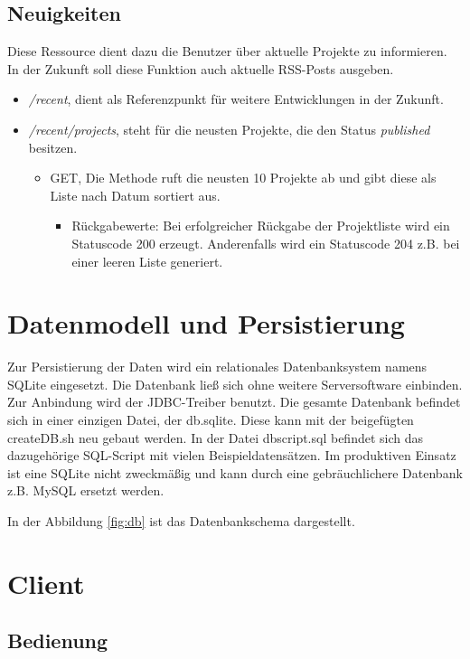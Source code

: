 \documentclass[12pt]{scrartcl}
\begin{document}
\subsection{Neuigkeiten}
Diese Ressource dient dazu die Benutzer über aktuelle Projekte zu informieren. In der Zukunft soll diese Funktion auch aktuelle RSS-Posts ausgeben.
\begin{itemize}
	\item\emph{/recent}, dient als Referenzpunkt für weitere Entwicklungen in der Zukunft.
	\item\emph{/recent/projects}, steht für die neusten Projekte, die den Status \emph{published} besitzen.
	\begin{itemize}
		\item GET, Die Methode ruft die neusten 10 Projekte ab und gibt diese als Liste nach Datum sortiert aus.
		\begin{itemize}
			\item Rückgabewerte: Bei erfolgreicher Rückgabe der Projektliste wird ein Statuscode 200 erzeugt. Anderenfalls wird ein Statuscode 204 z.B. bei einer leeren Liste generiert.
		\end{itemize}
	\end{itemize} 
\end{itemize}
	\section{Datenmodell und Persistierung}
	Zur Persistierung der Daten wird ein relationales Datenbanksystem namens SQLite eingesetzt. Die Datenbank ließ sich ohne weitere Serversoftware einbinden. Zur Anbindung wird der JDBC-Treiber benutzt. Die gesamte Datenbank befindet sich in einer einzigen Datei, der db.sqlite. Diese kann mit der beigefügten createDB.sh neu gebaut werden. In der Datei dbscript.sql befindet sich das dazugehörige SQL-Script mit vielen Beispieldatensätzen. Im produktiven Einsatz ist eine SQLite nicht zweckmäßig und kann durch eine gebräuchlichere Datenbank z.B. MySQL ersetzt werden.  
	
	In der Abbildung \ref{fig:db} ist das Datenbankschema dargestellt. 
	\section{Client}
	\label{sec:client}
		\subsection{Bedienung}
		
\end{document}
